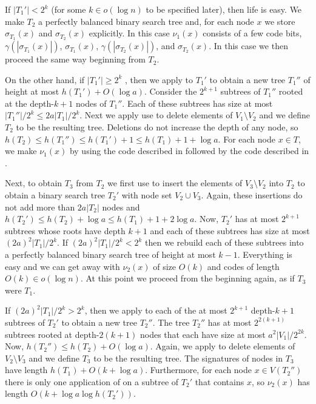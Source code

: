 \documentclass[kpfonts]{patmorin}
\begin{document}
If $|T_1'|<2^k$ (for some $k\in o(\log n)$ to be specified later), then life is easy.  We make $T_2$ a perfectly balanced binary search tree and, for each node $x$ we store $\sigma_{T_1}(x)$ and $\sigma_{T_2}(x)$ explicitly.  In this case $\nu_1(x)$ consists of a few code bits, $\gamma(|\sigma_{T_1}(x)|)$, $\sigma_{T_1}(x)$, $\gamma(|\sigma_{T_2}(x)|)$, and $\sigma_{T_2}(x)$.  In this case we then proceed the same way beginning from $T_2$.

On the other hand, if $|T_1'|\ge 2^k$ , then we apply  to $T_1'$ to obtain a new tree $T_1''$ of height at most $h(T_1')+O(\log a)$.  Consider the $2^{k+1}$ subtrees of $T_1''$ rooted at the depth-$k+1$ nodes of $T_1''$.  Each of these subtrees has size at most $|T_1''|/2^k\le 2a|T_1|/2^k$.  Next we apply use  to delete elements of $V_1\setminus V_2$ and we define $T_2$ to be the resulting tree.  Deletions do not increase the depth of any node, so $h(T_2)\le h(T_1'')\le h(T_1')+1\le h(T_1)+1+\log a$.  For each node $x\in T$, we make $\nu_1(x)$ by using the code described in  followed by the code described in .

Next, to obtain $T_3$ from $T_2$ we first use  to insert the elements of $V_3\setminus V_2$ into $T_2$ to obtain a binary search tree $T_2'$ with node set $V_2\cup V_3$.   Again, these insertions do not add more than $2a|T_2|$ nodes and $h(T_2')\le h(T_2)+\log a\le h(T_1)+1+2\log a$.  Now, $T_2'$ has at most $2^{k+1}$ subtrees whose roots have depth $k+1$ and each of these subtrees has size at most $(2a)^2|T_1|/2^k$.  If $(2a)^2|T_1|/2^k < 2^k$ then we rebuild each of these subtrees into a perfectly balanced binary search tree of height at most $k-1$.  Everything is easy and we can get away with $\nu_2(x)$ of size $O(k)$ and codes of length $O(k)\in o(\log n)$.  At this point we proceed from the beginning again, as if $T_3$ were $T_1$.

If $(2a)^2|T_1|/2^k > 2^k$, then we apply  to each of the at most $2^{k+1}$ depth-$k+1$ subtrees of $T_2'$ to obtain a new tree $T_2''$.  The tree $T_2''$ has at most $2^{2(k+1)}$ subtrees rooted at depth-$2(k+1)$ nodes that each have size at most $a^2|V_1|/2^{2k}$. Now, $h(T_2'')\le h(T_2)+O(\log a)$. Again, we apply  to delete elements of $V_2\setminus V_3$ and we define $T_3$ to be the resulting tree.  The signatures of nodes in $T_3$ have length $h(T_1)+O(k+\log a)$.  Furthermore, for each node $x\in V(T_2'')$ there is only one application of  on a subtree of $T_2'$ that contains $x$, so $\nu_2(x)$ has length $O(k+\log a\log h(T_2'))$.
\end{document}
